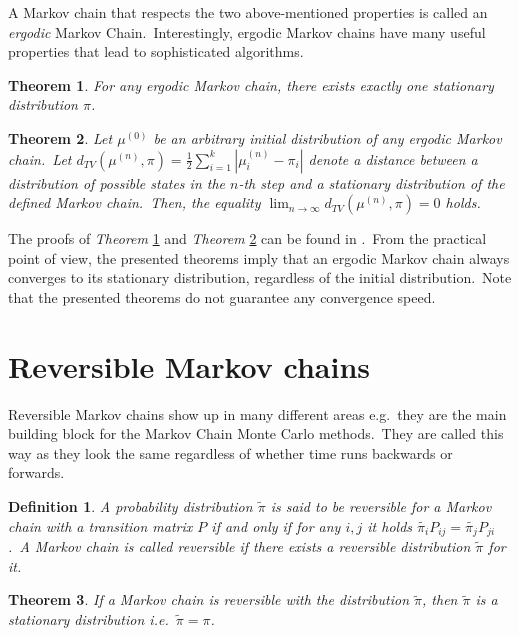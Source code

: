 \documentclass[shortabstract, english, lic]{iithesis}
\theoremstyle{default_theorem_style}\newtheorem{theorem}{Theorem}
\theoremstyle{default_theorem_style}\newtheorem{definition}{Definition}
\begin{document}
\noindent A Markov chain that respects the two above-mentioned properties is called an \textit{ergodic} Markov
Chain.\ Interestingly, ergodic Markov chains have many useful properties that lead to sophisticated algorithms.

\begin{theorem}\label{thm:one_stationary}
For any ergodic Markov chain, there exists exactly one stationary distribution $\pi$.
\end{theorem}

\begin{theorem}\label{thm:converges_to_stationary}
Let $\mu^{(0)}$ be an arbitrary initial distribution of any ergodic Markov chain.\ Let
$d_{TV}(\mu^{(n)}, \pi) = \frac{1}{2} \sum_{i = 1}^{k} |\mu_i^{(n)} - \pi_i|$ denote a distance between a
distribution of possible states in the $n$-th step and a stationary distribution of the defined Markov chain.\ Then,
the equality $\lim_{n \to \infty} d_{TV}(\mu^{(n)}, \pi) = 0$ holds.
\end{theorem}

\noindent The proofs of \textit{Theorem} \ref{thm:one_stationary} and \textit{Theorem}
\ref{thm:converges_to_stationary} can be found in \cite{markov_chains_book}.\ From the practical point of view, the
presented theorems imply that an ergodic Markov chain always converges to its stationary distribution, regardless of
the initial distribution.\ Note that the presented theorems do not guarantee any convergence speed.

\section{Reversible Markov chains}

Reversible Markov chains show up in many different areas e.g.\ they are the main building block for the Markov
Chain Monte Carlo methods.\ They are called this way as they look the same regardless of whether time runs
backwards or forwards.

\begin{definition}
A probability distribution $\tilde{\pi}$ is said to be \textit{reversible} for a Markov chain with a transition
matrix $P$ if and only if for any $i,j$ it holds $\tilde{\pi_i} P_{ij} = \tilde{\pi_j} P_{ji}$.\ A Markov chain is called
reversible if there exists a reversible distribution $\tilde{\pi}$ for it.
\end{definition}

\begin{theorem}\label{reversible_chain}
If a Markov chain is reversible with the distribution $\tilde{\pi}$, then $\tilde{\pi}$ is a stationary distribution
i.e.\ $\tilde{\pi} = \pi$.
\end{theorem}
\end{document}
